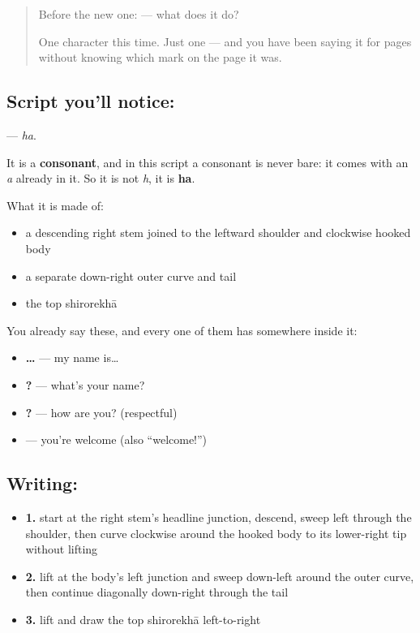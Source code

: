 \label{lesson:HI-S114-letter-ha}



\begin{quote}
Before the new one:  — what does it do?

One character this time. Just one — and you have been saying it for pages without knowing which mark on the page it was.
\end{quote}

\subsection*{Script you'll notice: }
\textbf{} — \emph{ha}.

It is a \textbf{consonant}, and in this script a consonant is never bare: it comes with an \emph{a} already in it. So it is not \emph{h}, it is \textbf{ha}.

What it is made of:

\begin{itemize}
\raggedright
  \item a descending right stem joined to the leftward shoulder and clockwise hooked body
  \item a separate down-right outer curve and tail
  \item the top shirorekhā
\end{itemize}

You already say these, and every one of them has  somewhere inside it:

\begin{itemize}
\raggedright
  \item \textbf{  … } — my name is…
  \item \textbf{   ?} — what's your name?
  \item \textbf{  ?} — how are you? (respectful)
  \item \textbf{  } — you're welcome (also \textquotedblleft{}welcome!\textquotedblright{})
\end{itemize}

\subsection*{Writing: }

\begin{itemize}
\raggedright
  \item \textbf{1.} start at the right stem's headline junction, descend, sweep left through the shoulder, then curve clockwise around the hooked body to its lower-right tip without lifting
  \item \textbf{2.} lift at the body's left junction and sweep down-left around the outer curve, then continue diagonally down-right through the tail
  \item \textbf{3.} lift and draw the top shirorekhā left-to-right
\end{itemize}

